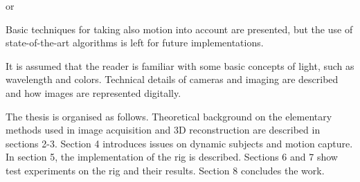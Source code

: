 
or

%
%

Basic techniques for taking also motion into account are presented, but the use of state-of-the-art algorithms is left for future implementations.


It is assumed that the reader is familiar with some basic concepts of light, such as wavelength and colors. Technical details of cameras and imaging are described and how images are represented digitally. %

The thesis is organised as follows.
Theoretical background on the elementary methods used in image acquisition and 3D reconstruction are described in sections 2-3.
Section 4 introduces issues on dynamic subjects and motion capture.
In section 5, the implementation of the rig is described.
Sections 6 and 7 show test experiments on the rig and their results.
Section 8 concludes the work.
